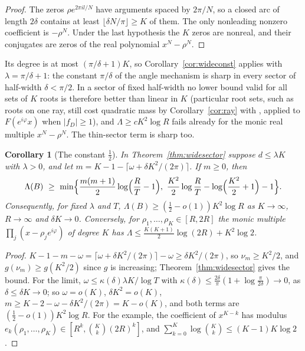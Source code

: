 \documentclass[11pt]{article}
\newtheorem{corollary}[theorem]{Corollary}
\begin{document}
\begin{proof}
The zeros $\rho e^{2\pi il/N}$ have arguments spaced by $2\pi/N$, so a closed
arc of length $2\delta$ contains at least $\lfloor\delta N/\pi\rfloor\ge K$ of
them.  The only nonleading nonzero coefficient is $-\rho^N$.  Under the last
hypothesis the $K$ zeros are nonreal, and their conjugates are zeros of the
real polynomial $x^N-\rho^N$.
\end{proof}

Its degree is at most $(\pi/\delta+1)K$, so Corollary~\ref{cor:wideconst}
applies with $\lambda=\pi/\delta+1$: the constant $\pi/\delta$ of the angle
mechanism is sharp in every sector of half-width $\delta<\pi/2$.  In a sector of fixed half-width no
lower bound valid for all sets of $K$ roots is therefore better than linear
in $K$ (particular root sets, such as roots on one ray, still cost
quadratic mass by Corollary~\ref{cor:ray} with
\cite[Corollary~3.4]{coefficient-mass}, applied to $F(e^{i\varphi}x)$ when
$|f_D|\ge1$), and $\Lambda\ge cK^2\log R$ fails already
for the monic real multiple $x^N-\rho^N$.  The thin-sector term is sharp too.

\begin{corollary}[The constant $\frac12$]\label{cor:thinconst}
In Theorem~\ref{thm:widesector} suppose $d\le\lambda K$ with $\lambda>0$, and
let $m=K-1-\lceil\omega+\delta K^2/(2\pi)\rceil$.  If $m\ge0$, then
\[
  \Lambda(B)\ \ge\ \min\Bigl\{\frac{m(m+1)}2\log\Bigl(\frac RT-1\Bigr),\
  \frac{K^2}2\log\frac RT-\log\Bigl(\frac{K^2}2+1\Bigr)-1\Bigr\}.
\]
Consequently, for fixed $\lambda$ and $T$, $\Lambda(B)\ge(\frac12-o(1))K^2\log R$
as $K\to\infty$, $R\to\infty$ and $\delta K\to0$.  Conversely, for
$\rho_1,\ldots,\rho_K\in[R,2R]$ the monic multiple
$\prod_j(x-\rho_je^{i\varphi})$ of degree $K$ has
$\Lambda\le\frac{K(K+1)}2\log(2R)+K^2\log2$.
\end{corollary}

\begin{proof}
$K-1-m-\omega=\lceil\omega+\delta K^2/(2\pi)\rceil-\omega\ge\delta K^2/(2\pi)$,
so $\nu_m\ge K^2/2$, and $g(\nu_m)\ge g(K^2/2)$ since $g$ is increasing;
Theorem~\ref{thm:widesector} gives the bound.  For the limit,
$\omega\le\kappa(\delta)\lambda K/\log T$ with
$\kappa(\delta)\le\frac{2\delta}\pi(1+\log\frac\pi{2\delta})\to0$, as
$\delta\le\delta K\to0$; so $\omega=o(K)$, $\delta K^2=o(K)$,
$m\ge K-2-\omega-\delta K^2/(2\pi)=K-o(K)$, and both terms are
$(\frac12-o(1))K^2\log R$.  For the example, the coefficient of
$x^{K-k}$ has modulus $e_k(\rho_1,\ldots,\rho_K)\in[R^k,\binom Kk(2R)^k]$,
and $\sum_{k=0}^K\log\binom Kk\le(K-1)K\log2$.
\end{proof}
\end{document}
